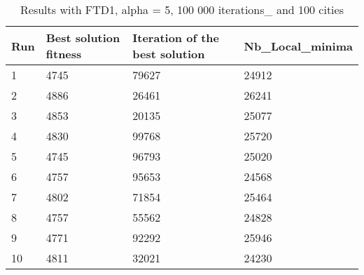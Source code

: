 \documentclass[12pt,oneside,a4paper]{article}
\begin{document}
\begin{table}[h]
  \centering
  \small
  \begin{tabular}{llll}
    \hline
    \multicolumn{1}{|l|}{\textbf{Run}}& \multicolumn{1}{l|}{\textbf{Best solution fitness}}& \multicolumn{1}{l|}{\textbf{Iteration of the best solution}}& \multicolumn{1}{l|}{\textbf{Nb\_Local\_minima}}\\ \hline
    \multicolumn{1}{|l|}{1} & \multicolumn{1}{l|}{4745}  & \multicolumn{1}{l|}{79627} & \multicolumn{1}{l|}{24912}  \\ \hline
    \multicolumn{1}{|l|}{2} & \multicolumn{1}{l|}{4886}  & \multicolumn{1}{l|}{26461} & \multicolumn{1}{l|}{26241}  \\ \hline         
    \multicolumn{1}{|l|}{3} & \multicolumn{1}{l|}{4853}  & \multicolumn{1}{l|}{20135}  & \multicolumn{1}{l|}{25077}  \\ \hline
    \multicolumn{1}{|l|}{4} & \multicolumn{1}{l|}{4830}  & \multicolumn{1}{l|}{99768}  & \multicolumn{1}{l|}{25720}  \\ \hline
    \multicolumn{1}{|l|}{5} & \multicolumn{1}{l|}{4745}  & \multicolumn{1}{l|}{96793}  & \multicolumn{1}{l|}{25020}  \\ \hline
    \multicolumn{1}{|l|}{6} & \multicolumn{1}{l|}{4757}  & \multicolumn{1}{l|}{95653}  & \multicolumn{1}{l|}{24568}  \\ \hline
    \multicolumn{1}{|l|}{7} & \multicolumn{1}{l|}{4802}  & \multicolumn{1}{l|}{71854}  & \multicolumn{1}{l|}{25464}  \\ \hline
    \multicolumn{1}{|l|}{8} & \multicolumn{1}{l|}{4757}  & \multicolumn{1}{l|}{55562} & \multicolumn{1}{l|}{24828}  \\ \hline
    \multicolumn{1}{|l|}{9} & \multicolumn{1}{l|}{4771}  & \multicolumn{1}{l|}{92292} & \multicolumn{1}{l|}{25946}  \\ \hline
    \multicolumn{1}{|l|}{10} & \multicolumn{1}{l|}{4811}  & \multicolumn{1}{l|}{32021} & \multicolumn{1}{l|}{24230}  \\ \hline
  \end{tabular}
  \caption{Results with FTD1, alpha = 5, 100 000 iterations\_ and 100 cities}
\end{table}
\end{document}
